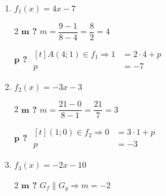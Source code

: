 %
%
    \raggedcolumns
    \begin{enumerate}
        \item $f_1(x) = 4x-7$

              \begin{multicols}{2}
                  \textbf{$\bm{m}$ ?}
                  \medbreak
                  $m=\dfrac{9-1}{8-4}=\dfrac{8}{2}=4$

                  \textbf{$\bm{p}$ ?}
                  \medbreak
                  $\begin{aligned}[t]
                          A(4;1)\in f_1 \Rightarrow 1 & = 2\cdot 4 + p \\
                          p                           & = -7
                      \end{aligned}$
              \end{multicols}
        \item $f_2(x) = -3x-3$
              \begin{multicols}{2}
                  \textbf{$\bm{m}$ ?}
                  \medbreak
                  $m=\dfrac{21-0}{8-1}=\dfrac{21}{7}=3$

                  \textbf{$\bm{p}$ ?}
                  \medbreak
                  $\begin{aligned}[t]
                          (1;0)\in f_2 \Rightarrow 0 & = 3\cdot 1 + p \\
                          p                             & = -3
                      \end{aligned}$
              \end{multicols}
        \item $f_3(x) = -2x - 10$
              \begin{multicols}{2}
                  \textbf{$\bm{m}$ ?}
                  \medbreak
                  $G_f \parallel G_g \Rightarrow m = -2$
                  \columnbreak


\end{multicols}
\end{enumerate}
